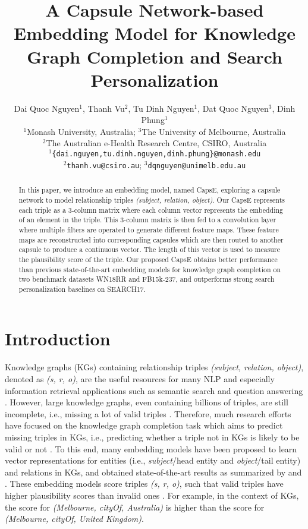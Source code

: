 \documentclass[11pt,a4paper]{article}
\title{A Capsule Network-based Embedding Model for Knowledge Graph Completion and Search Personalization}
\author{Dai Quoc Nguyen${}^{1}$, Thanh Vu${}^{2}$, Tu Dinh Nguyen${}^{1}$, Dat Quoc Nguyen${}^{3}$, Dinh Phung${}^{1}$ \\
${}^{1}$Monash University, Australia; ${}^{3}$The University of Melbourne, Australia\\ ${}^{2}$The Australian e-Health Research Centre, CSIRO, Australia\\
${}^{1}${\tt{{\{dai.nguyen,tu.dinh.nguyen,dinh.phung\}@monash.edu}}} \\
${}^{2}${\tt{{thanh.vu@csiro.au}}}; ${}^{3}${\tt{{dqnguyen@unimelb.edu.au}}}
}
\begin{document}
\maketitle

\begin{abstract}

In this paper, we introduce an embedding model, named CapsE, exploring a capsule network to model relationship triples \textit{(subject, relation, object)}. Our CapsE represents each triple as a 3-column matrix where each column vector represents the embedding of an element in the triple. This 3-column matrix is then fed to a convolution layer where multiple filters are operated to generate different feature maps. These feature maps are reconstructed into corresponding capsules which are then routed to another capsule to produce a continuous vector. The length of this vector is used to measure the plausibility score of the triple. Our proposed CapsE obtains better performance than previous state-of-the-art embedding models for knowledge graph completion on two benchmark datasets WN18RR and FB15k-237, and outperforms strong search personalization baselines on SEARCH17.



\end{abstract}

\section{Introduction}
Knowledge graphs (KGs) containing relationship triples \textit{(subject, relation, object)}, denoted as \textit{(s, r, o)}, are the useful resources for many NLP and especially information retrieval applications such as semantic  search and question answering \citep{8047276}. 
However, large knowledge graphs, even containing billions of triples, are still incomplete, i.e., missing a lot of valid triples \citep{West:2014}. 
Therefore, much research efforts have focused on the knowledge graph completion task which aims to predict missing triples in KGs, i.e., predicting whether a triple not in KGs is likely to be valid or not \citep{bordes2011learning,NIPS2013_5071,NIPS2013_5028}. 
To this end, many embedding models have been proposed to learn vector representations for entities (i.e., \textit{subject}/head entity and \textit{object}/tail entity) and relations in KGs, and obtained state-of-the-art results as summarized by \citet{NickelMTG15} and \citet{Nguyen2017}.
These embedding models score triples \textit{(s, r, o)}, such that valid triples have higher plausibility scores than invalid ones \citep{bordes2011learning,NIPS2013_5071,NIPS2013_5028}. 
For example, in the context of KGs, the score for \textit{(Melbourne, cityOf, Australia)} is higher than the score for \textit{(Melbourne, cityOf, United Kingdom)}.
 
\end{document}
